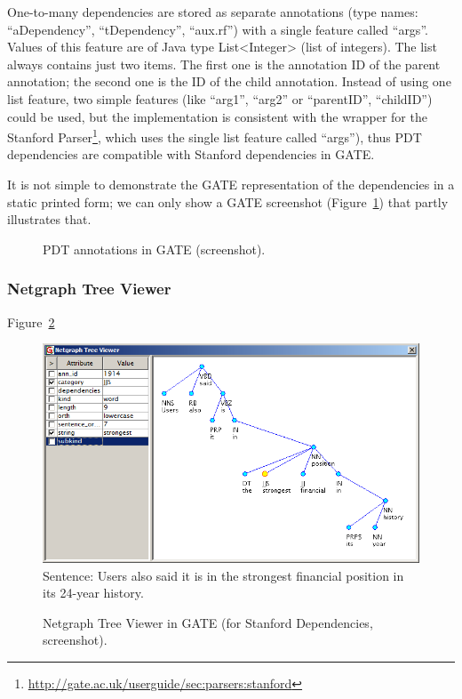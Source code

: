 One-to-many dependencies are stored as separate annotations (type names: ``aDependency'', ``tDependency'', ``aux.rf'') with a single feature called ``args''. Values of this feature are of Java type List<Integer> (list of integers). The list always contains just two items. The first one is the annotation ID of the parent annotation; the second one is the ID of the child annotation. Instead of using one list feature, two simple features (like ``arg1'', ``arg2'' or ``parentID'', ``childID'') could be used, but the implementation is consistent with the wrapper for the Stanford Parser\footnote{\url{http://gate.ac.uk/userguide/sec:parsers:stanford}}, which uses the single list feature called ``args''), thus PDT dependencies are compatible with Stanford dependencies in GATE.

It is not simple to demonstrate the GATE representation of the dependencies in a static printed form; we can only show a GATE screenshot (Figure~\ref{fig:PDT_GATE}) that partly illustrates that.


\begin{figure}
	\centering
	\caption{PDT annotations in GATE (screenshot).}
	\label{fig:PDT_GATE}
\end{figure}


\subsubsection{Netgraph Tree Viewer} \label{sec:learning_GATE_Netgraph}

Figure~\ref{fig:GATE_Netgraph}

\begin{figure}
	\centering
		\includegraphics[width=0.7\hsize]{netgraph_stanford}
		\\Sentence: Users also said it is in the strongest financial position in its 24-year history.
	\caption{Netgraph Tree Viewer in GATE (for Stanford Dependencies, screenshot).}
	\label{fig:GATE_Netgraph}
\end{figure}


